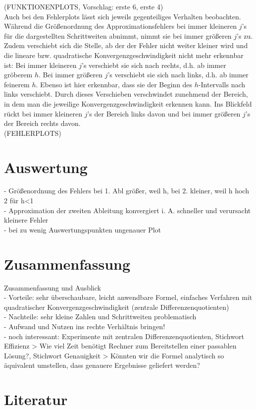 \documentclass{scrartcl}
\begin{document}
(FUNKTIONENPLOTS, Vorschlag: erste 6, erste 4) \\
Auch bei den Fehlerplots lässt sich jeweils gegenteiliges Verhalten beobachten. Während die Größenordnung des Approximationsfehlers bei immer kleineren $j$'s für die dargestellten Schrittweiten abnimmt, nimmt sie bei immer größeren $j$'s zu. Zudem verschiebt sich die Stelle, ab der der Fehler nicht weiter kleiner wird und die lineare bzw. quadratische Konvergenzgeschwindigkeit nicht mehr erkennbar ist: Bei immer kleineren $j$'s verschiebt sie sich nach rechts, d.h. ab immer gröberem $h$. Bei immer größeren $j$'s verschiebt sie sich nach links, d.h. ab immer feinerem $h$. Ebenso ist hier erkennbar, dass sie der Beginn des $h$-Intervalls nach links verschiebt. Durch dieses Verschieben verschwindet zunehmend der Bereich, in dem man die jeweilige Konvergenzgeschwindigkeit erkennen kann. Ins Blickfeld rückt bei immer kleineren $j$'s der Bereich links davon und bei immer größeren $j$'s der Bereich rechts davon. \\
(FEHLERPLOTS) \\

\pagebreak \section{Auswertung}
\label{sec:auswertung}
- Größenordnung des Fehlers bei 1. Abl größer, weil h, bei 2. kleiner, weil h hoch 2 für h<1 \\
- Approximation der zweiten Ableitung konvergiert i. A. schneller und verursacht kleinere Fehler \\
- bei zu wenig Auswertungspunkten ungenauer Plot \\

\pagebreak \section{Zusammenfassung}
\label{sec:zusammenfassung}
Zusammenfassung und Ausblick \\
- Vorteile: sehr überschaubare, leicht anwendbare Formel, einfaches Verfahren mit
quadratischer Konvergenzgeschwindigkeit (zentrale Differenzenquotienten) \\
- Nachteile: sehr kleine Zahlen und Schrittweiten problematisch \\
- Aufwand und Nutzen ins rechte Verhältnis bringen! \\
- noch interessant: Experimente mit zentralen Differenzenquotienten, Stichwort
Effizienz > Wie viel Zeit benötigt Rechner zum Bereitstellen einer passablen Lösung?,
Stichwort Genauigkeit > Könnten wir die Formel analytisch so äquivalent umstellen,
dass genauere Ergebnisse geliefert werden? \\

\pagebreak \section{Literatur}
\label{sec:literatur}
\end{document}
